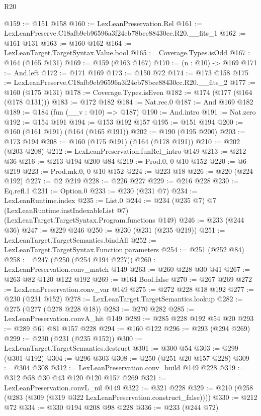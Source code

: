 \begin{lexlean}{R20}
\begin{coremodule}
@159 := @151 @158
@160 := LexLeanPreservation.Rel
@161 := LexLeanPreserve.C18afb9eb96596a3f24eb78bce88430cc.R20.__fits_1
@162 := @161 @131
@163 := @160 @162
@164 := LexLeanTarget.TargetSyntax.Value.bool
@165 := Coverage.Types.isOdd
@167 := @164 (@165 @131)
@169 := @159 (@163 @167)
@170 := (n : @10) -> @169
@171 := And.left
@172 := @171 @169
@173 := @150 @72
@174 := @173 @158
@175 := LexLeanPreserve.C18afb9eb96596a3f24eb78bce88430cc.R20.__fits_2
@177 := @160 (@175 @131)
@178 := Coverage.Types.isEven
@182 := @174 (@177 (@164 (@178 @131)))
@183 := @172 @182
@184 := Nat.rec.{0}
@187 := And @169 @182
@189 := @184 (fun (__v : @10) => @187)
@190 := And.intro
@191 := Nat.zero
@192 := @154 @191
@194 := @153 @192 @157
@195 := @151 @194
@200 := @160 (@161 @191) (@164 (@165 @191))
@202 := @190 (@195 @200)
@203 := @173 @194
@208 := @160 (@175 @191) (@164 (@178 @191))
@210 := @202 (@203 @208)
@212 := LexLeanPreservation.funRel_intro @149
@213 := @212 @36
@216 := @213 @194 @200 @84
@219 := Prod.{0, 0} @10 @152
@220 := @6 @219
@223 := Prod.mk.{0, 0} @10 @152
@224 := @223 @18
@226 := @220 (@224 @192)
@227 := @2 @219
@228 := @226 @227
@229 := @216 @228
@230 := Eq.refl.{1}
@231 := Option.{0}
@233 := @230 (@231 @7)
@234 := LexLeanRuntime.index
@235 := List.{0}
@244 := @234
    (@235 @7)
    @7
    (LexLeanRuntime.instIndexableList @7)
    (LexLeanTarget.TargetSyntax.Program.functions @149)
@246 := @233 (@244 @36)
@247 := @229 @246
@250 := @230 (@231 (@235 @219))
@251 := LexLeanTarget.TargetSemantics.bindAll
@252 := LexLeanTarget.TargetSyntax.Function.parameters
@254 := @251 (@252 @84)
@258 := @247 (@250 (@254 @194 @227))
@260 := LexLeanPreservation.conv_match @149
@263 := @260 @228 @30 @41
@267 := @263 @82 @120 @122 @192
@269 := @164 Bool.false
@270 := @267 @269
@272 := LexLeanPreservation.conv_var @149
@275 := @272 @228 @18 @192
@277 := @230 (@231 @152)
@278 := LexLeanTarget.TargetSemantics.lookup
@282 := @275 (@277 (@278 @228 @18))
@283 := @270 @282
@285 := LexLeanPreservation.convA_hit @149
@289 := @285 @228 @192 @54 @20
@293 := @289 @61 @81 @157 @228
@294 := @160 @122
@296 := @293 (@294 @269)
@299 := @230 (@231 (@235 @152))
@300 := LexLeanTarget.TargetSemantics.destruct
@301 := @300 @54
@303 := @299 (@301 @192)
@304 := @296 @303
@308 := @250 (@251 @20 @157 @228)
@309 := @304 @308
@312 := LexLeanPreservation.conv_build @149 @228
@319 := @312 @58 @30 @43 @120 @120 @157 @269
@321 := LexLeanPreservation.convL_nil @149
@322 := @321 @228
@329 := @210 (@258 (@283 (@309 (@319 @322 LexLeanPreservation.construct_false))))
@330 := @212 @72
@334 := @330 @194 @208 @98 @228
@336 := @233 (@244 @72)

\end{coremodule}
\end{lexlean}
